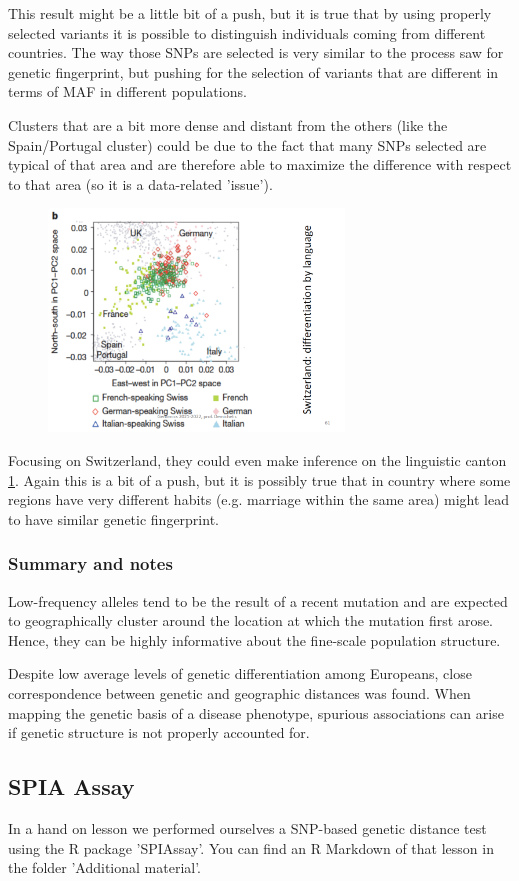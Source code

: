 This result might be a little bit of a push, but it is true that by using properly selected variants it is possible to distinguish individuals coming from different countries. The way those SNPs are selected is very similar to the process saw for genetic fingerprint, but pushing for the selection of variants that are different in terms of MAF in different populations. 

Clusters that are a bit more dense and distant from the others (like the Spain/Portugal cluster) could be due to the fact that many SNPs selected are typical of that area and are therefore able to maximize the difference with respect to that area (so it is a data-related 'issue').

\begin{figure}
	\centering
	\includegraphics[width=0.7\textwidth]{PCA_swiss.PNG}
	\caption{\label{fig: PCA_swiss}}
\end{figure}

Focusing on Switzerland, they could even make inference on the linguistic canton \ref*{fig: PCA_swiss}. Again this is a bit of a push, but it is possibly true that in country where some regions have very different habits (e.g. marriage within the same area) might lead to have similar genetic fingerprint. 


\subsubsection*{Summary and notes}
Low-frequency alleles tend to be the result of a recent mutation and are expected to geographically cluster around the location at which the mutation first arose. Hence, they can be highly informative about the fine-scale population structure.

Despite low average levels of genetic differentiation among Europeans, close correspondence between genetic and geographic distances was
found. When mapping the genetic basis of a disease phenotype, spurious
associations can arise if genetic structure is not properly accounted for.



\subsection*{SPIA Assay}
In a hand on lesson we performed ourselves a SNP-based genetic distance test using the R package 'SPIAssay'. You can find an R Markdown of that lesson in the folder 'Additional material'. 
